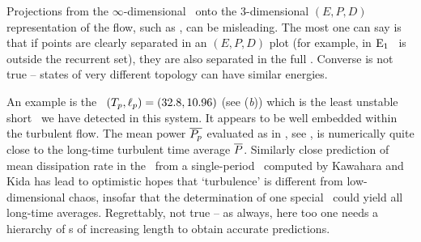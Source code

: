 Projections from the $\infty$-dimensional \statesp\ onto the 3-dimensional
$(E,P,D)$ representation of the flow, such as
, can be misleading.
The most one can say is that if points are clearly separated in an
$(E,P,D)$ plot (for example, in 
$\mathrm{E}_{1}$ \eqv\ is outside the recurrent set), they are also separated
in the full \statesp.  Converse is not true -- states of
very different topology can have similar energies.

An example is
the \rpo\ $({T_{p}},\ell_p) = (32.8,10.96)$
(see (\textit{b})) which is the least
unstable short \rpo\ we have detected in this system. It appears to be
well embedded within the turbulent flow. The mean power $\overline{P_p}$ evaluated
as in , see ,
is numerically quite close to the long-time
turbulent time average $\overline{P}$.
Similarly close prediction of mean dissipation rate in the
\pCf\ from a single-period \po\ computed by
Kawahara and Kida has lead to
optimistic hopes that `turbulence' is different from
low-dimensional chaos, insofar that the determination of one special
\po\ could yield all long-time averages.
Regrettably, not true -- as always, here too one needs a hierarchy
of \po s of increasing length to obtain accurate
predictions.

